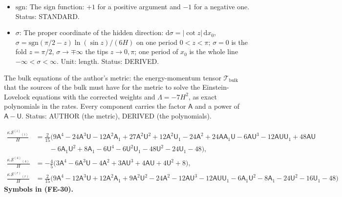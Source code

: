 \documentclass[
  10pt,
]{article}
\begin{document}
\begin{itemize}
  \(H\), \(\mathsf{U}_1 = \mathsf{U}'/H\). Unit: dimensionless. Status:
  DERIVED.
\item
  \(\mathrm{sgn}\): The sign function: \(+1\) for a positive argument
  and \(-1\) for a negative one. Status: STANDARD.
\item
  \(\sigma\): The proper coordinate of the hidden direction:
  \(\mathrm{d}\sigma = \lvert\cot z\rvert\,\mathrm{d}x_0\),
  \(\sigma = \mathrm{sgn}(\pi/2 - z)\ln(\sin z)/(6H)\) on one period
  \(0 < z < \pi\); \(\sigma = 0\) is the fold \(z = \pi/2\),
  \(\sigma \to \mp\infty\) the tips \(z \to 0, \pi\); one period of
  \(x_0\) is the whole line \(-\infty < \sigma < \infty\). Unit: length.
  Status: DERIVED.
\end{itemize}

The bulk equations of the author's metric: the energy-momentum tensor
\(\mathcal{T}_{\mathrm{bulk}}\) that the sources of the bulk must have
for the metric to solve the Einstein-Lovelock equations with the
corrected weights and \(\Lambda = -7H^2\), as exact polynomials in the
rates. Every component carries the factor \(\mathsf{A}\) and a power of
\(\mathsf{A} - \mathsf{U}\). Status: AUTHOR (the metric), DERIVED (the
polynomials).

\[
\begin{aligned}
\frac{\kappa\,\mathcal{S}^{(i)}{}_{(i)}}{H} &= \frac{2}{15}\big(9\mathsf{A}^4 - 24\mathsf{A}^3\mathsf{U} - 12\mathsf{A}^2\mathsf{A}_1
 + 27\mathsf{A}^2\mathsf{U}^2 + 12\mathsf{A}^2\mathsf{U}_1 - 24\mathsf{A}^2 + 24\mathsf{A}\mathsf{A}_1\mathsf{U} - 6\mathsf{A}\mathsf{U}^3
 - 12\mathsf{A}\mathsf{U}\mathsf{U}_1 + 48\mathsf{A}\mathsf{U}\\
&\qquad - 6\mathsf{A}_1\mathsf{U}^2 + 8\mathsf{A}_1 - 6\mathsf{U}^4 - 6\mathsf{U}^2\mathsf{U}_1 - 48\mathsf{U}^2 - 24\mathsf{U}_1 - 48\big),\\
\frac{\kappa\,\mathcal{S}^{(4)}{}_{(4)}}{H} &= -\frac45\big(3\mathsf{A}^4 - 6\mathsf{A}^3\mathsf{U} - 4\mathsf{A}^2 + 3\mathsf{A}\mathsf{U}^3
 + 4\mathsf{A}\mathsf{U} + 4\mathsf{U}^2 + 8\big),\\
\frac{\kappa\,\mathcal{S}^{(r)}{}_{(r)}}{H} &= \frac{2}{15}\big(9\mathsf{A}^4 - 12\mathsf{A}^3\mathsf{U} + 12\mathsf{A}^2\mathsf{A}_1
 + 9\mathsf{A}^2\mathsf{U}^2 - 24\mathsf{A}^2 - 12\mathsf{A}\mathsf{U}^3 - 12\mathsf{A}\mathsf{U}\mathsf{U}_1 - 6\mathsf{A}_1\mathsf{U}^2 - 8\mathsf{A}_1
 - 24\mathsf{U}^2 - 16\mathsf{U}_1 - 48\big)
\end{aligned} \tag{FE-30}
\] \textbf{Symbols in (FE-30).}
\end{document}
